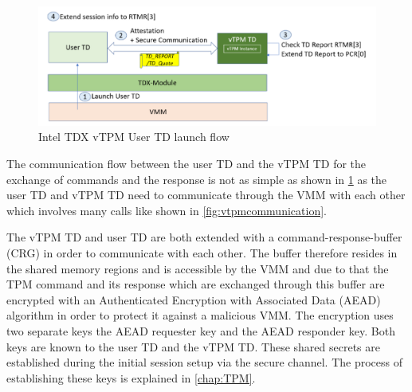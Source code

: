 \documentclass[sigplan,screen,nonacm]{acmart}
\begin{document}
\begin{figure}
  \centering
  \includegraphics[width=\linewidth]{pictures/vTPM_TD_launch.png}
  \caption{Intel TDX vTPM User TD launch flow \cite{Intel-vTPM}}
  \label{fig:vtpmlaunchusertd}
\end{figure}

 The communication flow between the user TD and the vTPM TD for the exchange of commands and the response is not as simple as shown in \cref{fig:vtpmlaunchusertd} as the user TD and vTPM TD need to communicate through the VMM with each other which involves many calls like shown in \cref{fig:vtpmcommunication}.

The vTPM TD and user TD are both extended with a command-response-buffer (CRG) in order to communicate with each other.
The buffer therefore resides in the shared memory regions and is accessible by the VMM and due to that the TPM command and its response which are exchanged through this buffer are encrypted with an Authenticated Encryption with Associated Data (AEAD) algorithm in order to protect it against a malicious VMM.
The encryption uses two separate keys the AEAD requester key and the AEAD responder key.
Both keys are known to the user TD and the vTPM TD.
These shared secrets are established during the initial session setup via the secure channel.
The process of establishing these keys is explained in \cref{chap:TPM}.
\end{document}
